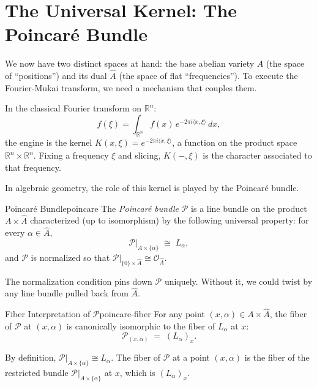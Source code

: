 \documentclass{article}
\newcommand{\R}{{\mathbb{R}}}
\newcommand{\CO}{{\mathcal{O}}}
\newcommand{\CP}{{\mathcal{P}}}
\begin{document}
\section{The Universal Kernel: The Poincar\'{e} Bundle}

We now have two distinct spaces at hand: the base abelian variety $A$ (the space of ``positions'') and its dual $\hat{A}$ (the space of flat ``frequencies''). To execute the Fourier-Mukai transform, we need a mechanism that couples them.

In the classical Fourier transform on $\R^n$:
\[
    \hat{f}(\xi) = \int_{\R^n} f(x)\, e^{-2\pi i \langle x, \xi \rangle} \, dx,
\]
the engine is the kernel $K(x, \xi) = e^{-2\pi i \langle x, \xi \rangle}$, a function on the product space $\R^n \times \widehat{\R^n}$. Fixing a frequency $\xi$ and slicing, $K(-, \xi)$ is the character associated to that frequency.

In algebraic geometry, the role of this kernel is played by the Poincar\'{e} bundle.

\begin{defn}{Poincar\'{e} Bundle}{poincare}
The \emph{Poincar\'{e} bundle} $\CP$ is a line bundle on the product $A \times \hat{A}$ characterized (up to isomorphism) by the following universal property: for every $\alpha \in \hat{A}$,
\[
    \CP|_{A \times \{\alpha\}} \;\cong\; L_\alpha,
\]
and $\CP$ is normalized so that $\CP|_{\{0\} \times \hat{A}} \cong \CO_{\hat{A}}$.
\end{defn}

The normalization condition pins down $\CP$ uniquely. Without it, we could twist by any line bundle pulled back from $\hat{A}$.

\begin{prop}{Fiber Interpretation of $\CP$}{poincare-fiber}
For any point $(x, \alpha) \in A \times \hat{A}$, the fiber of $\CP$ at $(x, \alpha)$ is canonically isomorphic to the fiber of $L_\alpha$ at $x$:
\[
    \CP_{(x, \alpha)} \;=\; (L_\alpha)_x.
\]
\end{prop}

\begin{Proof}
By definition, $\CP|_{A \times \{\alpha\}} \cong L_\alpha$. The fiber of $\CP$ at a point $(x, \alpha)$ is the fiber of the restricted bundle $\CP|_{A \times \{\alpha\}}$ at $x$, which is $(L_\alpha)_x$.
\end{Proof}
\end{document}
